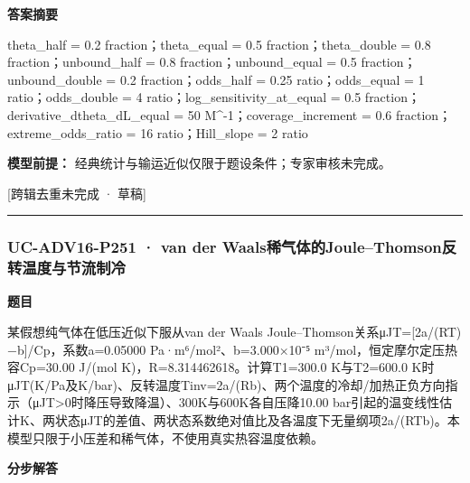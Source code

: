 \documentclass[UTF8,11pt,a4paper]{ctexart}
\begin{document}
\noindent\textbf{答案摘要}\par
theta\_half = 0.2 fraction；theta\_equal = 0.5 fraction；theta\_double = 0.8 fraction；unbound\_half = 0.8 fraction；unbound\_equal = 0.5 fraction；unbound\_double = 0.2 fraction；odds\_half = 0.25 ratio；odds\_equal = 1 ratio；odds\_double = 4 ratio；log\_sensitivity\_at\_equal = 0.5 fraction；derivative\_dtheta\_dL\_equal = 50 M\textasciicircum{}-1；coverage\_increment = 0.6 fraction；extreme\_odds\_ratio = 16 ratio；Hill\_slope = 2 ratio\par
\noindent\textbf{模型前提：}
经典统计与输运近似仅限于题设条件；专家审核未完成。\par
\noindent\textcolor{red!65!black}{[跨辑去重未完成 · 草稿]} \par
\medskip\hrule\medskip
{}
\subsubsection*{UC-ADV16-P251 · van der Waals稀气体的Joule–Thomson反转温度与节流制冷}
\noindent\textbf{题目}\par
某假想纯气体在低压近似下服从van der Waals Joule–Thomson关系μJT=[2a/(RT)−b]/Cp，系数a=0.05000 Pa·m⁶/mol²、b=3.000×10⁻⁵ m³/mol，恒定摩尔定压热容Cp=30.00 J/(mol K)，R=8.314462618。计算T1=300.0 K与T2=600.0 K时μJT(K/Pa及K/bar)、反转温度Tinv=2a/(Rb)、两个温度的冷却/加热正负方向指示（μJT>0时降压导致降温）、300K与600K各自压降10.00 bar引起的温变线性估计K、两状态μJT的差值、两状态系数绝对值比及各温度下无量纲项2a/(RTb)。本模型只限于小压差和稀气体，不使用真实热容温度依赖。\par
\medskip\noindent\textbf{分步解答}
\end{document}
